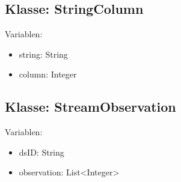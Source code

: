 \subsection{Klasse: StringColumn}
Variablen:
\begin{itemize}
	\item string: String
	\item column: Integer
\end{itemize} 

\subsection{Klasse: StreamObservation}
Variablen: 
\begin{itemize}
	\item dsID: String
	\item observation: List<Integer>
\end{itemize}
